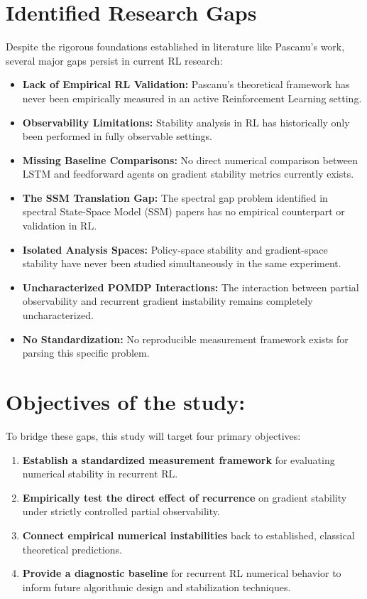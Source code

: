 \documentclass[11pt,a4paper]{article}
\begin{document}
\section{Identified Research Gaps}
Despite the rigorous foundations established in literature like Pascanu's work, several major gaps persist in current RL research:
\begin{itemize}
    \item \textbf{Lack of Empirical RL Validation:} Pascanu's theoretical framework has never been empirically measured in an active Reinforcement Learning setting.
    \item \textbf{Observability Limitations:} Stability analysis in RL has historically only been performed in fully observable settings.
    \item \textbf{Missing Baseline Comparisons:} No direct numerical comparison between LSTM and feedforward agents on gradient stability metrics currently exists.
    \item \textbf{The SSM Translation Gap:} The spectral gap problem identified in spectral State-Space Model (SSM) papers has no empirical counterpart or validation in RL.
    \item \textbf{Isolated Analysis Spaces:} Policy-space stability and gradient-space stability have never been studied simultaneously in the same experiment.
    \item \textbf{Uncharacterized POMDP Interactions:} The interaction between partial observability and recurrent gradient instability remains completely uncharacterized.
    \item \textbf{No Standardization:} No reproducible measurement framework exists for parsing this specific problem.
\end{itemize}

\section{Objectives of the study: }
To bridge these gaps, this study will target four primary objectives:
\begin{enumerate}
    \item \textbf{Establish a standardized measurement framework} for evaluating numerical stability in recurrent RL.
    \item \textbf{Empirically test the direct effect of recurrence} on gradient stability under strictly controlled partial observability.
    \item \textbf{Connect empirical numerical instabilities} back to established, classical theoretical predictions.
    \item \textbf{Provide a diagnostic baseline} for recurrent RL numerical behavior to inform future algorithmic design and stabilization techniques.
\end{enumerate}
\end{document}
